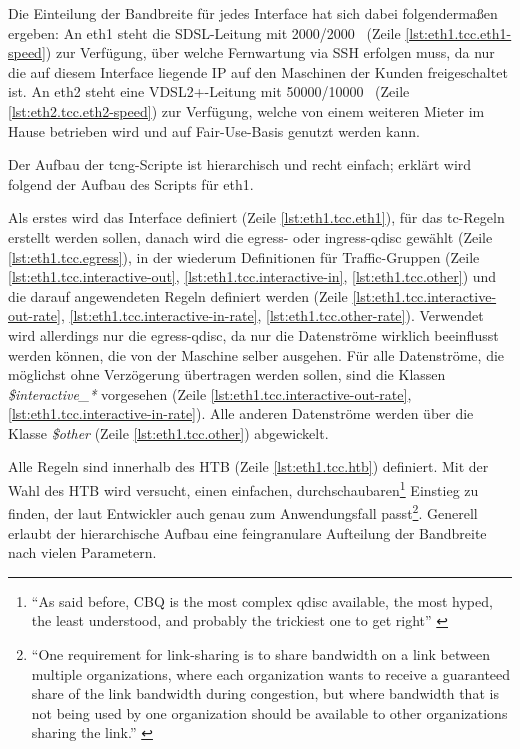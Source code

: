 Die Einteilung der Bandbreite für jedes Interface hat sich dabei folgendermaßen ergeben:
An eth1 steht die \gls{SDSL}-Leitung mit 2000/2000~{\kibi\bit\per\second} (Zeile \vref{lst:eth1.tcc.eth1-speed}) zur Verfügung, über welche Fernwartung via SSH erfolgen muss, da nur die auf diesem Interface liegende IP auf den Maschinen der Kunden freigeschaltet ist. An eth2 steht eine \gls{VDSL2+}-Leitung mit 50000/10000~{\kibi\bit\per\second} (Zeile \vref{lst:eth2.tcc.eth2-speed}) zur Verfügung, welche von einem weiteren Mieter im Hause betrieben wird und auf Fair-Use-Basis genutzt werden kann.

Der Aufbau der \gls{tcng}-Scripte ist hierarchisch und recht einfach; erklärt wird folgend der Aufbau des Scripts für eth1.

Als erstes wird das Interface definiert (Zeile \vref{lst:eth1.tcc.eth1}), für das \gls{tc}-Regeln erstellt werden sollen, danach wird die \gls{egress}- oder \gls{ingress}-\gls{qdisc} gewählt (Zeile \ref{lst:eth1.tcc.egress}), in der wiederum Definitionen für Traffic-Gruppen (Zeile \ref{lst:eth1.tcc.interactive-out}, \ref{lst:eth1.tcc.interactive-in}, \ref{lst:eth1.tcc.other}) und die darauf angewendeten Regeln definiert werden (Zeile \ref{lst:eth1.tcc.interactive-out-rate}, \ref{lst:eth1.tcc.interactive-in-rate}, \ref{lst:eth1.tcc.other-rate}). Verwendet wird allerdings nur die \gls{egress}-\gls{qdisc}, da nur die Datenströme wirklich beeinflusst werden können, die von der Maschine selber ausgehen.
Für alle Datenströme, die möglichst ohne Verzögerung übertragen werden sollen, sind die Klassen \emph{\$interactive\_*}  vorgesehen (Zeile \ref{lst:eth1.tcc.interactive-out-rate}, \ref{lst:eth1.tcc.interactive-in-rate}). %
Alle anderen Datenströme werden über die Klasse \emph{\$other} (Zeile \ref{lst:eth1.tcc.other}) abgewickelt.

Alle Regeln sind innerhalb des \gls{HTB} (Zeile \ref{lst:eth1.tcc.htb}) definiert. Mit der Wahl des \gls{HTB} wird versucht, einen einfachen, durchschaubaren\footnote{"`As said before, CBQ is the most complex qdisc available, the most hyped, the least understood, and probably the trickiest one to get right"' \citep[Kapitel 9.5.4.]{LARTC}} Einstieg zu finden, der laut Entwickler auch genau zum Anwendungsfall passt\footnote{"`One requirement for link-sharing is to share bandwidth on a link between multiple organizations, where each organization wants to receive a guaranteed share of the link bandwidth during  congestion, but where bandwidth that is not being used by one  organization should be available to other organizations sharing  the link."' \citep[Kapitel 2.8]{DSERV}}.
Generell erlaubt der hierarchische Aufbau eine feingranulare Aufteilung der Bandbreite nach vielen Parametern.

